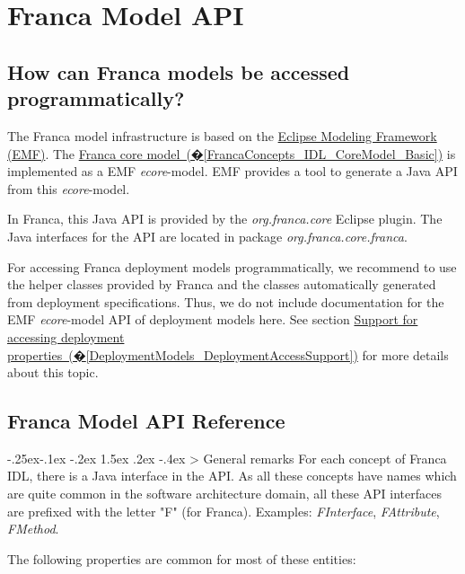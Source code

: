\documentclass[a4paper,10pt]{scrreprt}
\makeatletter
\renewcommand\subsection{\medskip\@startsection{subsection}{2}{\z@}%
  {-.25ex\@plus -.1ex \@minus -.2ex}%
  {1.5ex \@plus .2ex \@minus -.4ex}%
  {\ifnum \scr@compatibility>\@nameuse{scr@v@2.96}\relax
    \setlength{\parfillskip}{\z@ plus 1fil}\fi
    \raggedsection\normalfont\sectfont\nobreak\size@subsection
  }%
}
\makeatother
\begin{document}
\chapter{Franca Model API}
\label{FrancaModelAPI}
\section{How can Franca models be accessed programmatically?}
\label{FrancaModelGeneral}
The Franca model infrastructure is based on the
\href{http://www.eclipse.org/modeling/emf/}{Eclipse Modeling Framework (EMF)}.
The \hyperref[FrancaConcepts_IDL_CoreModel_Basic]{Franca core model~(�\ref*{FrancaConcepts_IDL_CoreModel_Basic})} is implemented as
a EMF \textit{ecore}-model. EMF provides a tool to generate a Java API from this \textit{ecore}-model.

In Franca, this Java API is provided by the \textit{org.franca.core} Eclipse plugin.
The Java interfaces for the API are located in package \textit{org.franca.core.franca}.

For accessing Franca deployment models programmatically, we recommend to use
the helper classes provided by Franca and the classes automatically generated from
deployment specifications. Thus, we do not include documentation for the EMF
\textit{ecore}-model API of deployment models here. See section
\hyperref[DeploymentModels_DeploymentAccessSupport]{Support for accessing deployment properties~(�\ref*{DeploymentModels_DeploymentAccessSupport})}
for more details about this topic.

\section{Franca Model API Reference}
\label{FrancaModelAPIReference}
\subsection{General remarks}
\label{FrancaModelAPIReference_General}
For each concept of Franca IDL, there is a Java interface in the API.
As all these concepts have names which are quite common in the software
architecture domain, all these API interfaces are prefixed with the
letter "F" (for Franca). Examples: \textit{FInterface}, \textit{FAttribute}, \textit{FMethod}.

The following properties are common for most of these entities:
\end{document}

